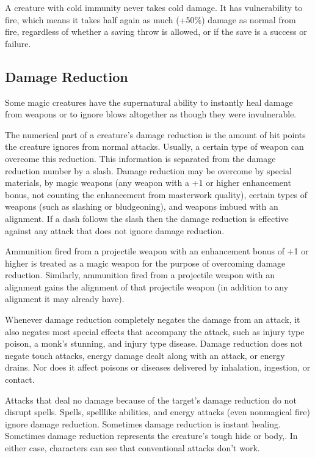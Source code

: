 A creature with cold immunity never takes cold damage. It has vulnerability to fire, which means it takes half again as much (+50\%) damage as normal from fire, regardless of whether a saving throw is allowed, or if the save is a success or failure.

\subsection{Damage Reduction}

Some magic creatures have the supernatural ability to instantly heal damage from weapons or to ignore blows altogether as though they were invulnerable.

The numerical part of a creature's damage reduction is the amount of hit points the creature ignores from normal attacks. Usually, a certain type of weapon can overcome this reduction. This information is separated from the damage reduction number by a slash. Damage reduction may be overcome by special materials, by magic weapons (any weapon with a +1 or higher enhancement bonus, not counting the enhancement from masterwork quality), certain types of weapons (such as slashing or bludgeoning), and weapons imbued with an alignment. If a dash follows the slash then the damage reduction is effective against any attack that does not ignore damage reduction.

Ammunition fired from a projectile weapon with an enhancement bonus of +1 or higher is treated as a magic weapon for the purpose of overcoming damage reduction. Similarly, ammunition fired from a projectile weapon with an alignment gains the alignment of that projectile weapon (in addition to any alignment it may already have).

Whenever damage reduction completely negates the damage from an attack, it also negates most special effects that accompany the attack, such as injury type poison, a monk's stunning, and injury type disease. Damage reduction does not negate touch attacks, energy damage dealt along with an attack, or energy drains. Nor does it affect poisons or diseases delivered by inhalation, ingestion, or contact. 

Attacks that deal no damage because of the target's damage reduction do not disrupt spells.
Spells, spell\textendash like abilities, and energy attacks (even nonmagical fire) ignore damage reduction.
Sometimes damage reduction is instant healing. Sometimes damage reduction represents the creature's tough hide or body,. In either case, characters can see that conventional attacks don't work.

